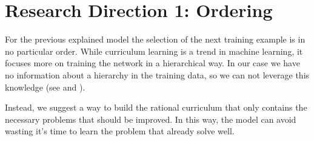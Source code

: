 \section{Research Direction 1: Ordering}
For the previous explained model the selection of the next training example is in no particular order. While curriculum learning is a trend in machine learning, it focuses more on training the network in a hierarchical way. In our case we have no information about a hierarchy in the training data, so we can not leverage this knowledge (see \cite{bengio2009curriculum} and \cite{graves2017automated}).

Instead, we suggest a way to build the rational curriculum that only contains the necessary problems that should be improved. In this way, the model can avoid wasting it’s time to learn the problem that already solve well.

